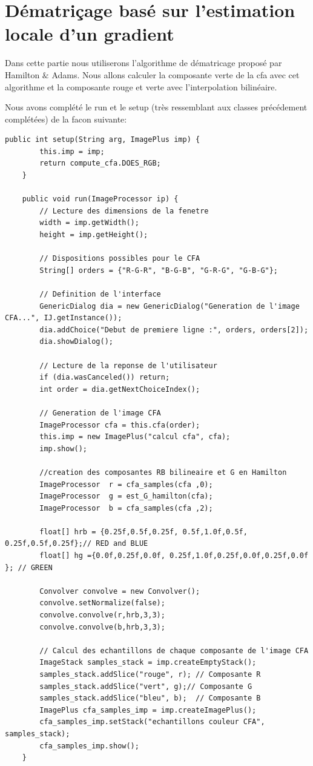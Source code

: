 \documentclass[a4paper,12pt]{report}
\begin{document}
\section*{Dématriçage basé sur l'estimation locale d'un gradient} 

Dans cette partie nous utiliserons l'algorithme de dématricage proposé par Hamilton $\&$ Adams. Nous allons calculer la composante verte de la cfa avec cet algorithme et la composante rouge et verte avec l'interpolation bilinéaire.

Nous avons complété le run et le setup (très ressemblant aux classes précédement complétées) de la facon suivante:
\begin{lstlisting}[style=Java]
	public int setup(String arg, ImagePlus imp) {
		this.imp = imp;
		return compute_cfa.DOES_RGB;
	}

	public void run(ImageProcessor ip) {
		// Lecture des dimensions de la fenetre
		width = imp.getWidth();
		height = imp.getHeight();

		// Dispositions possibles pour le CFA
		String[] orders = {"R-G-R", "B-G-B", "G-R-G", "G-B-G"};

		// Definition de l'interface
		GenericDialog dia = new GenericDialog("Generation de l'image CFA...", IJ.getInstance());
		dia.addChoice("Debut de premiere ligne :", orders, orders[2]);
		dia.showDialog();

		// Lecture de la reponse de l'utilisateur
		if (dia.wasCanceled()) return;
		int order = dia.getNextChoiceIndex();

		// Generation de l'image CFA
		ImageProcessor cfa = this.cfa(order);
		this.imp = new ImagePlus("calcul cfa", cfa);
		imp.show();

		//creation des composantes RB bilineaire et G en Hamilton
		ImageProcessor  r = cfa_samples(cfa ,0);
		ImageProcessor  g = est_G_hamilton(cfa);
		ImageProcessor  b = cfa_samples(cfa ,2);

		float[] hrb = {0.25f,0.5f,0.25f, 0.5f,1.0f,0.5f, 0.25f,0.5f,0.25f};// RED and BLUE
		float[] hg ={0.0f,0.25f,0.0f, 0.25f,1.0f,0.25f,0.0f,0.25f,0.0f	}; // GREEN
		
		Convolver convolve = new Convolver();
		convolve.setNormalize(false);
		convolve.convolve(r,hrb,3,3);				
		convolve.convolve(b,hrb,3,3);
		
		// Calcul des echantillons de chaque composante de l'image CFA
		ImageStack samples_stack = imp.createEmptyStack();
		samples_stack.addSlice("rouge", r);	// Composante R
		samples_stack.addSlice("vert", g);// Composante G
		samples_stack.addSlice("bleu", b);	// Composante B
		ImagePlus cfa_samples_imp = imp.createImagePlus();
		cfa_samples_imp.setStack("echantillons couleur CFA", samples_stack);
		cfa_samples_imp.show();
	}
\end{lstlisting}
\end{document}
